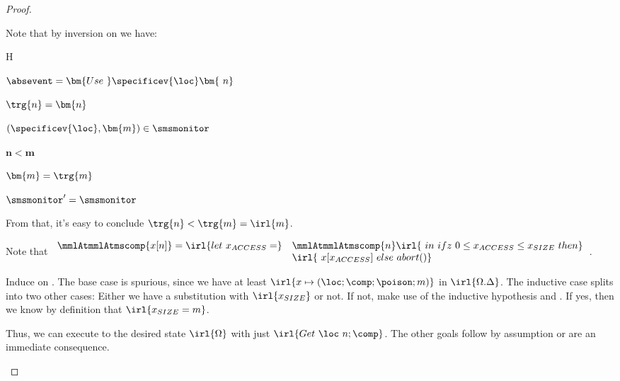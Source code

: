 \documentclass[a4paper,names,dvipsnames]{article}
\begin{document}
\begin{proof}
\begin{description}
          Note that by inversion on  we have:
          \begin{passumptions}{H}
            \item $\absevent=\bm{Use\ }\specificev{\loc}\bm{\ n}$
            \item $\trg{n}=\bm{n}$
            \item $(\specificev{\loc},\bm{m})\in\smsmonitor$
            \item $\bm{n}<\bm{m}$
            \item $\bm{m}=\trg{m}$
            \item $\smsmonitor'=\smsmonitor$
          \end{passumptions}
          From that, it's easy to conclude $\trg{n}<\trg{m}=\irl{m}$.

          Note that $\begin{array}{ll}\mmlAtmmlAtmscomp{x[n]}=\irl{let\ x_{ACCESS}=}&\mmlAtmmlAtmscomp{n}\irl{\ in\ ifz\ 0\le x_{ACCESS}\le x_{SIZE}\ then}\\&\irl{\ x[x_{ACCESS}]\ else\ abort()}\end{array}$.

          Induce on . The base case is spurious, since we have at least $\irl{x\mapsto(\loc;\comp;\poison;m)}$ in $\irl{\Omega.\Delta}$.
          The inductive case splits into two other cases: Either we have a substitution with $\irl{x_{SIZE}}$ or not.
          If not, make use of the inductive hypothesis and .
          If yes, then we know by definition that $\irl{x_{SIZE}=m}$.

          Thus, we can execute to the desired state $\irl{\Omega}$ with just $\irl{Get\ \loc\ n;\comp}$.
          The other goals follow by assumption or are an immediate consequence.



\end{description}
\end{proof}
\end{document}
